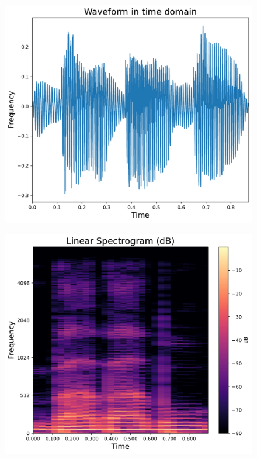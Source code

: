 \begin{figure}[h]
	\centering
	\begin{minipage}[b]{0.3\linewidth}
		\includegraphics[width=\linewidth]{"graphs/sectr_example/Waveform in time domain"}
		\label{fig:waveform-in-time-domain}
	\end{minipage}
	\hfill
		\begin{minipage}[b]{0.3\linewidth}
			\includegraphics[width=\linewidth]{"graphs/sectr_example/Linear Spectrogram (dB)"}

\end{minipage}
\end{figure}
